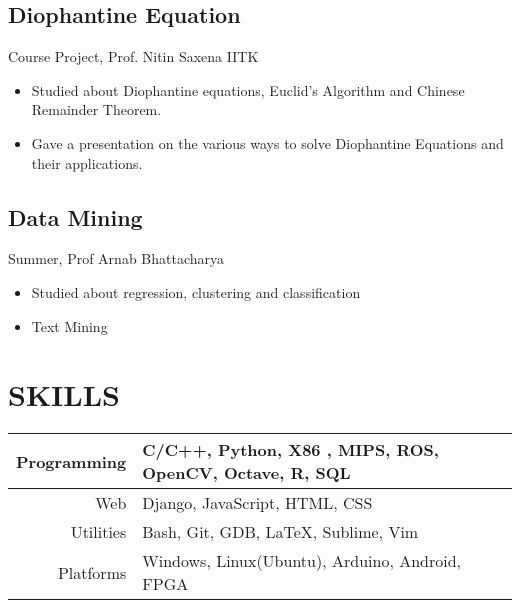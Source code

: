 \documentclass{article}
\begin{document}
    \subsection*{Diophantine Equation}
    {Course Project, Prof. Nitin Saxena \hfill IITK}
    \begin{itemize} 
        \itemsep0em
        \item Studied about Diophantine equations, Euclid’s Algorithm and Chinese Remainder Theorem.
        \item Gave a presentation on the various ways to solve Diophantine Equations and their applications.
    \end{itemize}

    \subsection*{Data Mining}
    {Summer, Prof Arnab Bhattacharya}
    \begin{itemize}
        \itemsep0em
        \item Studied about regression, clustering and classification
        \item Text Mining
    \end{itemize}
\begin{table}[h]
\section*{SKILLS}
    \begin{tabular}{|r|l|}
        \hline
         Programming & C/C++, Python, X86 , MIPS, ROS, OpenCV, Octave, R, SQL \\
         \hline
         Web & Django, JavaScript, HTML, CSS \\ 
         \hline
         Utilities & Bash, Git, GDB, \LaTeX, Sublime, Vim \\
         \hline
         Platforms &  Windows, Linux(Ubuntu), Arduino, Android, FPGA \\
        \hline
    \end{tabular}
\end{table}
\end{document}
